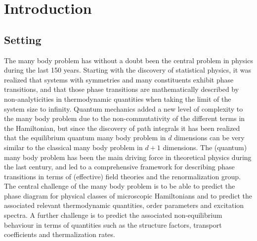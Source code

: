 \documentclass[rmp,aps,reprint,superscriptaddress,nobalancelastpage]{revtex4-1}
\begin{document}
\maketitle


\tableofcontents




\section{Introduction}
\subsection{Setting}


The many body problem has without a doubt been the central problem in physics during the last 150 years. Starting with the discovery of statistical physics, it was realized that systems with symmetries and many constituents exhibit phase transitions, and that those phase transitions are mathematically described by non-analyticities in thermodynamic quantities when taking the limit of the system size to infinity. Quantum mechanics added a new level of complexity to the many body problem due to the non-commutativity of the different terms in the Hamiltonian, but since the discovery of path integrals it has been realized that the equilibrium quantum many body problem in $d$ dimensions can be very similar to the classical many body problem in $d+1$ dimensions. The (quantum) many body problem has been the main driving force in theoretical physics during the last century, and led to a comprehensive framework for describing phase transitions in terms of (effective) field theories and the renormalization group. The central challenge of the many body problem is to be able to predict the phase diagram for physical classes of microscopic Hamiltonians and to predict the associated relevant thermodynamic quantities, order parameters and excitation spectra. A further challenge is to predict the associated non-equilibrium behaviour in terms of quantities such as the structure factors, transport coefficients and thermalization rates.
\end{document}
